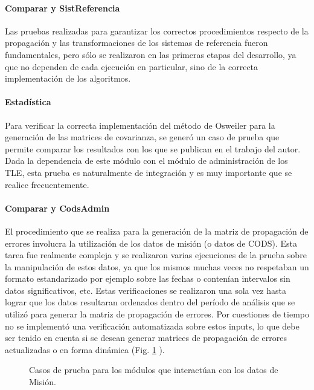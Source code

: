 \paragraph*{Comparar y SistReferencia}
Las pruebas realizadas para garantizar los correctos procedimientos respecto de la propagaci\'on y las transformaciones de los sistemas de referencia fueron fundamentales, pero s\'olo se realizaron en las primeras etapas del desarrollo, ya que no dependen de cada ejecuci\'on en particular, sino de la correcta implementaci\'on de los algoritmos.  

\paragraph*{Estad\'istica}
Para verificar la correcta implementaci\'on del m\'etodo de Osweiler para la generaci\'on de las matrices de covarianza, se gener\'o un caso de prueba que permite comparar los resultados con los que se publican en el trabajo del autor. Dada la dependencia de este m\'odulo con el m\'odulo de administraci\'on de los TLE, esta prueba es naturalmente de integraci\'on y es muy importante que se realice frecuentemente.

\paragraph*{Comparar y CodsAdmin}
El procedimiento que se realiza para la generaci\'on de la matriz de propagaci\'on de errores involucra la utilizaci\'on de los datos de misi\'on (o datos de CODS). Esta tarea fue realmente compleja y se realizaron varias ejecuciones de la prueba sobre la manipulaci\'on de estos datos, ya que los mismos muchas veces no respetaban un formato estandarizado por ejemplo sobre las fechas o conten\'ian intervalos sin datos significativos, etc. Estas verificaciones se realizaron una sola vez hasta lograr que los datos resultaran ordenados dentro del per\'iodo de an\'alisis que se utiliz\'o para generar la matriz de propagaci\'on de errores. Por cuestiones de tiempo no se implement\'o una verificaci\'on automatizada sobre estos inputs, lo que debe ser tenido en cuenta si se desean generar matrices de propagaci\'on de errores actualizadas o en forma din\'amica (Fig. \ref{fig:pruebaCods} ).

\begin{figure}[!h]
 \centering
 \caption[Casos de Prueba I]{Casos de prueba para los módulos que interactúan con los datos de Misión.}
 \label{fig:pruebaCods}
\end{figure}

